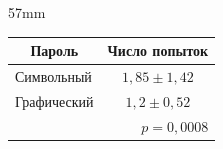 \begin{floatingfigure}{57mm}


\vspace*{-12pt}


{\small %


\begin{center}




\label{tab:stat_table}


\vspace*{2ex}





\tabcolsep=10pt


\begin{tabular}{|l|c|}


\hline


\multicolumn{1}{|c|}{Пароль} &Число попыток\\


\hline


 Символьный  & $1{,}85\pm 1{,}42$ \\


 Графический & \hphantom{9}$1{,}2\pm 0{,}52$\\


 \hline


 \multicolumn{2}{r}{$p=0{,}0008$}      \\ 


   \end{tabular}


\end{center}}




\end{floatingfigure}








\renewcommand{\figurename}{\protect\bf Рис.}


\renewcommand{\tablename}{\protect\bf Таблица}





\setcounter{figure}{2}



